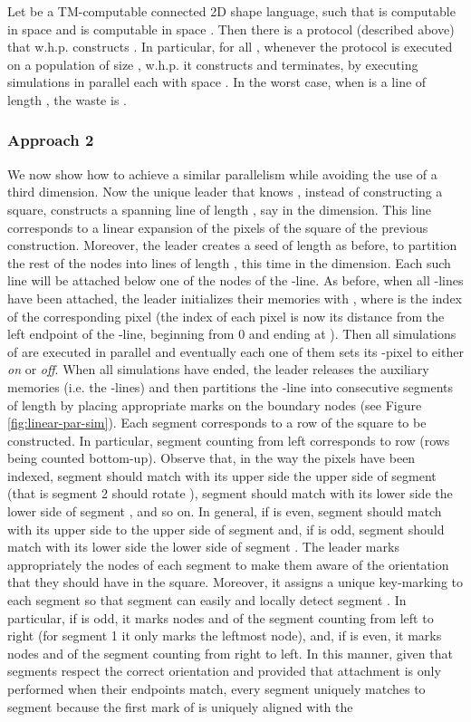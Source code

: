 \documentclass[oribibl, 11pt]{llncs}
\begin{document}
\begin{theorem}
Let  be a TM-computable connected 2D shape language, such that  is computable in space  and  is computable in space . Then there is a protocol (described above) that w.h.p. constructs . In particular, for all , whenever the protocol is executed on a population of size , w.h.p. it constructs  and terminates, by executing  simulations in parallel each with space . In the worst case, when  is a line of length , the waste is .
\end{theorem}

\subsubsection{Approach 2}

We now show how to achieve a similar parallelism while avoiding the use of a third dimension. Now the unique leader that knows , instead of constructing a square, constructs a spanning line of length , say in the  dimension. This line corresponds to a linear expansion of the pixels of the  square of the previous construction. Moreover, the leader creates a seed of length  as before, to partition the rest of the nodes into lines of length , this time in the  dimension. Each such line will be attached below one of the nodes of the -line. As before, when all -lines have been attached, the leader initializes their memories with , where  is the index of the corresponding pixel (the index of each pixel is now its distance from the left endpoint of the -line, beginning from 0 and ending at ). Then all simulations of  are executed in parallel and eventually each one of them sets its -pixel to either \emph{on} or \emph{off}. When all simulations have ended, the leader releases the auxiliary memories (i.e. the -lines) and then partitions the -line into consecutive segments of length  by placing appropriate marks on the boundary nodes (see Figure \ref{fig:linear-par-sim}). Each segment corresponds to a row of the  square to be constructed. In particular, segment  counting from left corresponds to row  (rows being counted bottom-up). Observe that, in the way the pixels have been indexed, segment  should match with its upper side the upper side of segment  (that is segment 2 should rotate ), segment  should match with its lower side the lower side of segment , and so on. In general, if  is even, segment  should match with its upper side to the upper side of segment  and, if  is odd, segment  should match with its lower side the lower side of segment . The leader marks appropriately the nodes of each segment to make them aware of the orientation that they should have in the square. Moreover, it assigns a unique key-marking to each segment so that segment  can easily and locally detect segment . In particular, if  is odd, it marks nodes  and  of the segment counting from left to right (for segment 1 it only marks the leftmost node), and, if  is even, it marks nodes  and  of the segment counting from right to left. In this manner, given that segments respect the correct orientation and provided that attachment is only performed when their endpoints match, every segment  uniquely matches to segment  because the first mark of  is uniquely aligned with the 
\end{document}
